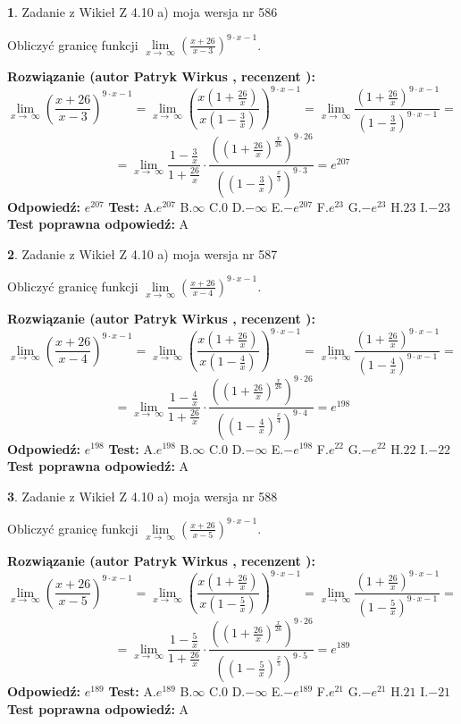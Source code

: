 \documentclass[12pt, a4paper]{article}
\theoremstyle{definition} %
\newtheorem{zad}{}
\newcommand{\zadStart}[1]{\begin{zad}#1\newline}
\newcommand{\zadStop}{\end{zad}}
\newcommand{\rozwStart}[2]{\noindent \textbf{Rozwiązanie (autor #1 , recenzent #2): }\newline}
\newcommand{\rozwStop}{\newline}
\newcommand{\odpStart}{\noindent \textbf{Odpowiedź:}\newline}
\newcommand{\odpStop}{\newline}
\newcommand{\testStart}{\noindent \textbf{Test:}\newline}
\newcommand{\testStop}{\newline}
\newcommand{\kluczStart}{\noindent \textbf{Test poprawna odpowiedź:}\newline}
\newcommand{\kluczStop}{\newline}
\begin{document}
\zadStart{Zadanie z Wikieł Z 4.10 a) moja wersja nr 586}

Obliczyć granicę funkcji  $\lim\limits_{x\to\ \infty}(\frac{x+26}{x-3})^{9\cdot x-1}$.
\zadStop
\rozwStart{Patryk Wirkus}{}
$$\lim\limits_{x\to\ \infty}(\frac{x+26}{x-3})^{9\cdot x-1} = \lim\limits_{x\to\ \infty}(\frac{x(1+\frac{26}{x})}{x(1-\frac{3}{x})})^{9\cdot x-1}=\lim\limits_{x\to\ \infty}\frac{(1+\frac{26}{x})^{9\cdot x-1}}{(1-\frac{3}{x})^{9\cdot x-1}}=$$
$$=\lim\limits_{x\to\ \infty}\frac{1-\frac{3}{x}}{1+\frac{26}{x}}\cdot\frac{((1+\frac{26}{x})^{\frac{x}{26}})^{9\cdot26}}{((1-\frac{3}{x})^{\frac{x}{3}})^{9\cdot3}}=e^{207}$$
\rozwStop
\odpStart
$e^{207}$
\odpStop
\testStart
A.$e^{207}$ B.$\infty$ C.$0$ D.$-\infty$ E.$-e^{207}$
F.$e^{23}$ G.$-e^{23}$
H.$23$
I.$-23$
\testStop
\kluczStart
A
\kluczStop



\zadStart{Zadanie z Wikieł Z 4.10 a) moja wersja nr 587}

Obliczyć granicę funkcji  $\lim\limits_{x\to\ \infty}(\frac{x+26}{x-4})^{9\cdot x-1}$.
\zadStop
\rozwStart{Patryk Wirkus}{}
$$\lim\limits_{x\to\ \infty}(\frac{x+26}{x-4})^{9\cdot x-1} = \lim\limits_{x\to\ \infty}(\frac{x(1+\frac{26}{x})}{x(1-\frac{4}{x})})^{9\cdot x-1}=\lim\limits_{x\to\ \infty}\frac{(1+\frac{26}{x})^{9\cdot x-1}}{(1-\frac{4}{x})^{9\cdot x-1}}=$$
$$=\lim\limits_{x\to\ \infty}\frac{1-\frac{4}{x}}{1+\frac{26}{x}}\cdot\frac{((1+\frac{26}{x})^{\frac{x}{26}})^{9\cdot26}}{((1-\frac{4}{x})^{\frac{x}{4}})^{9\cdot4}}=e^{198}$$
\rozwStop
\odpStart
$e^{198}$
\odpStop
\testStart
A.$e^{198}$ B.$\infty$ C.$0$ D.$-\infty$ E.$-e^{198}$
F.$e^{22}$ G.$-e^{22}$
H.$22$
I.$-22$
\testStop
\kluczStart
A
\kluczStop



\zadStart{Zadanie z Wikieł Z 4.10 a) moja wersja nr 588}

Obliczyć granicę funkcji  $\lim\limits_{x\to\ \infty}(\frac{x+26}{x-5})^{9\cdot x-1}$.
\zadStop
\rozwStart{Patryk Wirkus}{}
$$\lim\limits_{x\to\ \infty}(\frac{x+26}{x-5})^{9\cdot x-1} = \lim\limits_{x\to\ \infty}(\frac{x(1+\frac{26}{x})}{x(1-\frac{5}{x})})^{9\cdot x-1}=\lim\limits_{x\to\ \infty}\frac{(1+\frac{26}{x})^{9\cdot x-1}}{(1-\frac{5}{x})^{9\cdot x-1}}=$$
$$=\lim\limits_{x\to\ \infty}\frac{1-\frac{5}{x}}{1+\frac{26}{x}}\cdot\frac{((1+\frac{26}{x})^{\frac{x}{26}})^{9\cdot26}}{((1-\frac{5}{x})^{\frac{x}{5}})^{9\cdot5}}=e^{189}$$
\rozwStop
\odpStart
$e^{189}$
\odpStop
\testStart
A.$e^{189}$ B.$\infty$ C.$0$ D.$-\infty$ E.$-e^{189}$
F.$e^{21}$ G.$-e^{21}$
H.$21$
I.$-21$
\testStop
\kluczStart
A
\kluczStop
\end{document}
